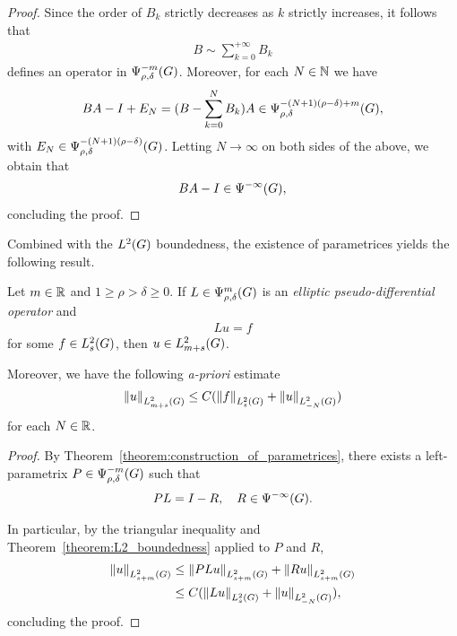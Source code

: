 \begin{proof}
    Since the order of $B_k$ strictly decreases as $k$ strictly increases,
    it follows that
    \begin{align*}
        B \sim \sum_{k = 0}^{+\infty} B_k
    \end{align*}
    defines an operator in $\OperatorClass {-m} {\rho, \delta}$.
    Moreover,
    for each $N \in \N$ we have
    \begin{align*}
        B A - I + E_{N}
        =
        (B - \sum_{k = 0}^N B_k) A \in \OperatorClass {-(N + 1) (\rho - \delta)  + m} {\rho, \delta},
    \end{align*}
    with $E_N \in \OperatorClass {-(N + 1)(\rho - \delta)} {\rho, \delta}$.
    Letting $N \to \infty$ on both sides of the above,
    we obtain that
    \begin{align*}
        B A - I \in \SmoothingOperators,
    \end{align*}
    concluding the proof.
\end{proof}

Combined with the $\Lebesgue 2 \Group$ boundedness,
the existence of parametrices yields the following result.

\begin{corollary}
\label{corollary:a-priori_estimates}
    Let $m \in \R$ and $1 \geq \rho > \delta \geq 0$.
    If $L \in \OperatorClass m {\rho, \delta}$ is an \emph{elliptic pseudo-differential operator} and
    \begin{align*}
        L u = f
    \end{align*}
    for some $f \in \Sobolev s$,
    then $u \in \Sobolev {m + s}$.

    Moreover, we have the following \emph{a-priori} estimate
    \begin{align*}
        \norm [\Sobolev {m + s}] {u}
        \leq C (\norm [\Sobolev s] {f} + \norm [\Sobolev {-N}] u)
    \end{align*}
    for each $N \in \R$.
\end{corollary}
\begin{proof}
    By Theorem~\ref{theorem:construction_of_parametrices},
    there exists a left-parametrix $P \in \OperatorClass {-m} {\rho, \delta}$ such that
    \begin{align*}
        P L = \Id {} - R,
        \quad R \in \SmoothingOperators.
    \end{align*}

    In particular,
    by the triangular inequality and Theorem~\ref{theorem:L2_boundedness} applied to $P$ and $R$,
    \begin{align*}
        \norm [\Sobolev {s + m}] {u}
        &\leq \norm [\Sobolev {s + m}] {P L u} + \norm [\Sobolev {s + m}] {R u}\\
        &\leq C (\norm [\Sobolev s] {L u} + \norm [\Sobolev {-N}] u),
    \end{align*}
    concluding the proof.
\end{proof}


